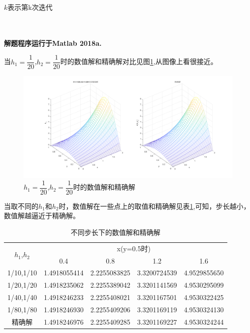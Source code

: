 \documentclass[withoutpreface,bwprint]{cumcmthesis} %
\begin{document}
	
	$k$表示第k次迭代
	
	~\\
	~\\
	
	
	\textbf{解题程序运行于Matlab 2018a.}
	
	当$h_{1}=\dfrac{1}{20}$,$h_{2}=\dfrac{1}{20}$时的数值解和精确解对比见图\ref{fig:f5},从图像上看很接近。
	\begin{figure}
		\centering
		\includegraphics[width=1\linewidth]{figures/f5}
		\caption{$h_{1}=\dfrac{1}{20}$,$h_{2}=\dfrac{1}{20}$时的数值解和精确解}
		\label{fig:f5}
	\end{figure}
	
	当取不同的$h_{1}$和$h_{2}$时，数值解在一些点上的取值和精确解见表\ref{tab:1},可知，步长越小，数值解越逼近于精确解。
	\begin{table}[htbp]
		\centering
		\caption{不同步长下的数值解和精确解}
		\begin{tabular}{crrrr}
			\toprule[1.5pt]
			\multirow{2}[0]{*}{$h_{1}$,$h_{2}$} & \multicolumn{4}{c}{x(y=0.5时)} \\
			& \multicolumn{1}{c}{0.4} & \multicolumn{1}{c}{0.8} & \multicolumn{1}{c}{1.2} & \multicolumn{1}{c}{1.6} \\
			\midrule[1pt]
			1/10,1/10 & 1.4918055414  & 2.2255083825  & 3.3200724539  & 4.9529855650  \\
			1/20,1/20 & 1.4918235062  & 2.2255389042  & 3.3201141569  & 4.9530295099  \\
			1/40,1/40 & 1.4918246233  & 2.2255408021  & 3.3201167501  & 4.9530322425  \\
			1/80,1/80 & 1.4918246930  & 2.2255409206  & 3.3201169119  & 4.9530324130  \\
			精确解   & 1.4918246976  & 2.2255409285  & 3.3201169227  & 4.9530324244  \\
			\bottomrule[1.5pt]
		\end{tabular}%
		\label{tab:1}%
	\end{table}%
\end{document}
